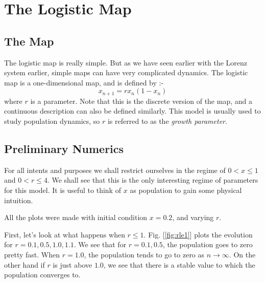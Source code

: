 
\chapter{The Logistic Map} %

\label{Chapter4} %

\section{The Map}
The logistic map is really simple. But as we have seen earlier with the Lorenz system earlier, simple maps can have very complicated dynamics. The logistic map is a one-dimensional map, and is defined by :-
\begin{equation}
	x_{n+1} = rx_n(1-x_n)
\end{equation}
where $r$ is a parameter. Note that this is the discrete version of the map, and a continuous description can also be defined similarly. This model is usually used to study population dynamics, so $r$ is referred to as the \textit{growth parameter}.

\section{Preliminary Numerics}
For all intents and purposes we shall restrict ourselves in the regime of $0<x\le 1$ and $0<r\le 4$. We shall see that this is the only interesting regime of parameters for this model. It is useful to think of $x$ as population to gain some physical intuition.

All the plots were made with initial condition $x=0.2$, and varying $r$.

First, let's look at what happens when $r\le1$. Fig. [\ref{fig:rle1}] plots the evolution for $r=0.1,0.5,1.0,1.1$. We see that for $r=0.1,0.5$, the population goes to zero pretty fast. When $r=1.0$, the population tends to go to zero as $n \rightarrow \infty$. On the other hand if $r$ is just above $1.0$, we see that there is a stable value to which the population converges to.

